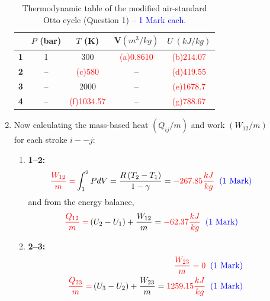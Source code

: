 \documentclass[12pt,twoside]{report}
\newcommand{\frc}{\displaystyle\frac}
\begin{document}
\begin{description}
\begin{enumerate}
\begin{table}[h]
\begin{center}
\begin{tabular}{|| c || c |c |c |c || }
\hline\hline
        & {\bf $P$ (bar)} & {\bf $T$ (K)}  & {\bf V$\left(m^{3}/kg\right)$} & {\bf $U\;\left(kJ/kg\right)$} \\
\hline
{\bf 1} & 1               &     300        &       \textcolor{red}{(a)0.8610}                      & \textcolor{red}{(b)214.07}                 \\    
{\bf 2} & --              &\textcolor{red}{(c)580}        &       --                      &  \textcolor{red}{(d)419.55}                 \\
{\bf 3} & --              &    2000        &       --                       & \textcolor{red}{(e)1678.7}                 \\
{\bf 4} & --              &\textcolor{red}{(f)1034.57}         &       --                      &  \textcolor{red}{(g)788.67}                 \\
\hline\hline
\end{tabular}
\end{center}
\caption{Thermodynamic table of the modified air-standard Otto cycle (Question 1) -- \textcolor{blue}{1 Mark each}.}\label{exam2_table1}
\end{table}

\item Now calculating the mass-based heat $\left(Q_{ij}/m\right)$ and work $\left(W_{12}/m\right)$ for each stroke $i--j$:
\begin{enumerate}
%
\item {\bf 1--2:}
\begin{displaymath}
\textcolor{red}{\frc{W_{12}}{m}=}\int_{1}^{2}P dV = \frc{R\left(T_{2}-T_{1}\right)}{1-\gamma} = \textcolor{red}{-267.85 \frc{kJ}{kg}}\;\;\textcolor{blue}{\text{(1 Mark)}}
\end{displaymath}
and from the energy balance,
\begin{displaymath}
\textcolor{red}{\frc{Q_{12}}{m}=}\left(U_{2}-U_{1}\right)+\frc{W_{12}}{m}=\textcolor{red}{-62.37\frc{kJ}{kg}}\;\;\textcolor{blue}{\text{(1 Mark)}}
\end{displaymath}

% 
\item {\bf 2--3:}
\begin{eqnarray}
&& \textcolor{red}{\frc{W_{23}}{m}=0} \;\;\textcolor{blue}{\text{(1 Mark)}} \nonumber \\
&& \textcolor{red}{\frc{Q_{23}}{m}=}\left(U_{3}-U_{2}\right)+\frc{W_{23}}{m}=\textcolor{red}{1259.15\frc{kJ}{kg}}\;\;\textcolor{blue}{\text{(1 Mark)}} \nonumber 
\end{eqnarray} 


\end{enumerate}
\end{enumerate}
\end{description}
\end{document}
